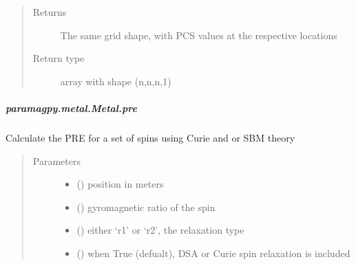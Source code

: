 \documentclass[a4paper,10pt,english,openany,oneside]{sphinxmanual}
\begin{document}
\begin{fulllineitems}
\begin{fulllineitems}
\begin{fulllineitems}
\begin{quote}
\begin{description}
\item[{Returns}] \leavevmode
{} \textendash{} The same grid shape, with PCS values at the respective locations

\item[{Return type}] \leavevmode
array with shape (n,n,n,1)

\end{description}\end{quote}

\end{fulllineitems}



\subparagraph{paramagpy.metal.Metal.pre}
\label{\detokenize{reference/generated/paramagpy.metal.Metal.pre:paramagpy-metal-metal-pre}}\label{\detokenize{reference/generated/paramagpy.metal.Metal.pre::doc}}

\begin{fulllineitems}
\label{\detokenize{reference/generated/paramagpy.metal.Metal.pre:paramagpy.metal.Metal.pre}}
Calculate the PRE for a set of spins using Curie and or SBM theory
\begin{quote}\begin{description}
\item[{Parameters}] \leavevmode\begin{itemize}
\item {} 
 () \textendash{} position in meters

\item {} 
 () \textendash{} gyromagnetic ratio of the spin

\item {} 
 () \textendash{} either ‘r1’ or ‘r2’, the relaxation type

\item {} 
 (\sphinxstyleliteralemphasis{\sphinxupquote{ (}}\sphinxstyleliteralemphasis{\sphinxupquote{)}}) \textendash{} when True (defualt), DSA or Curie spin relaxation is included


\end{itemize}
\end{description}
\end{quote}
\end{fulllineitems}
\end{fulllineitems}
\end{fulllineitems}
\end{document}
